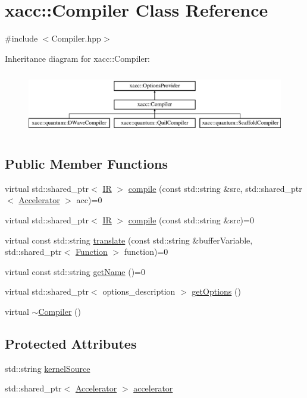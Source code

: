 \hypertarget{a01103}{}\section{xacc\+:\+:Compiler Class Reference}
\label{a01103}


{\ttfamily \#include $<$Compiler.\+hpp$>$}

Inheritance diagram for xacc\+:\+:Compiler\+:\begin{figure}[H]
\begin{center}
\leavevmode
\includegraphics[height=2.772277cm]{a01103}
\end{center}
\end{figure}
\subsection*{Public Member Functions}
\begin{DoxyCompactItemize}
\item 
virtual std\+::shared\+\_\+ptr$<$ \hyperlink{a01151}{IR} $>$ \hyperlink{a01103_a546a40c95bb93af6a0c0ac48dbeaffc8}{compile} (const std\+::string \&src, std\+::shared\+\_\+ptr$<$ \hyperlink{a01087}{Accelerator} $>$ acc)=0
\item 
virtual std\+::shared\+\_\+ptr$<$ \hyperlink{a01151}{IR} $>$ \hyperlink{a01103_a9092f5f779b570c91569b59621280c04}{compile} (const std\+::string \&src)=0
\item 
virtual const std\+::string \hyperlink{a01103_aeedbe58a33fed29e4d7694ae743e25e7}{translate} (const std\+::string \&buffer\+Variable, std\+::shared\+\_\+ptr$<$ \hyperlink{a01127}{Function} $>$ function)=0
\item 
virtual const std\+::string \hyperlink{a01103_a87fca9100e6462122f5b687c3a0fb3fb}{get\+Name} ()=0
\item 
virtual std\+::shared\+\_\+ptr$<$ options\+\_\+description $>$ \hyperlink{a01103_a9f5a8965c9c2dd895016d18264ebbe92}{get\+Options} ()
\item 
virtual \hyperlink{a01103_a5d0b012687d9b44893872eaa81e47b38}{$\sim$\+Compiler} ()
\end{DoxyCompactItemize}
\subsection*{Protected Attributes}
\begin{DoxyCompactItemize}
\item 
std\+::string \hyperlink{a01103_a0ad81c816c09e5113d03cdc02165c453}{kernel\+Source}
\item 
std\+::shared\+\_\+ptr$<$ \hyperlink{a01087}{Accelerator} $>$ \hyperlink{a01103_ad4cbb467fa7e377bac6c054ffcb22b7c}{accelerator}
\end{DoxyCompactItemize}


